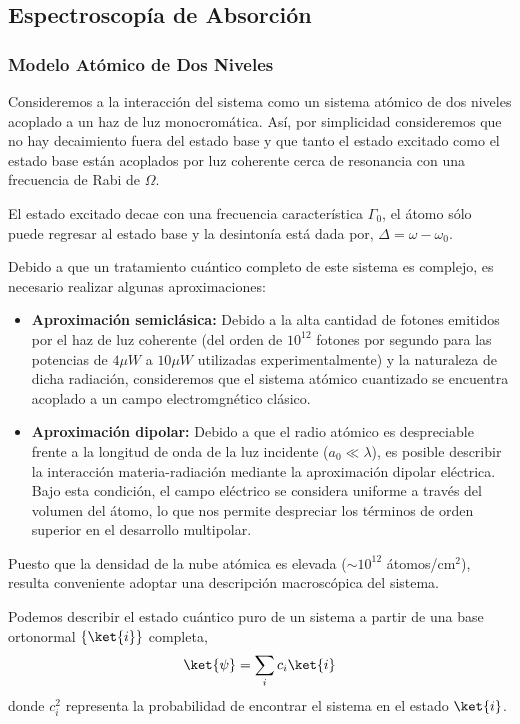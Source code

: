 \subsection{Espectroscopía de Absorción}

\subsubsection{Modelo Atómico de Dos Niveles}
Consideremos a la interacción del sistema como un sistema atómico de dos niveles acoplado a un haz de luz monocromática. Así, por simplicidad consideremos que no hay decaimiento fuera del estado base y que tanto el estado excitado como el estado base están acoplados por luz coherente cerca de resonancia con una frecuencia de Rabi de $\Omega$.

El estado excitado decae con una frecuencia característica $\Gamma_0$, el átomo sólo puede regresar al estado base y la desintonía está  dada por, $\Delta = \omega - \omega_0$.

Debido a que un tratamiento cuántico completo de este sistema es complejo, es necesario realizar algunas aproximaciones:

\begin{itemize}
    \item \textbf{Aproximación semiclásica:} Debido a la alta cantidad de fotones emitidos por el haz de luz coherente (del orden de $10^{12}$ fotones por segundo para las potencias de $4\mu W$ a $10 \mu W$ utilizadas experimentalmente) y la naturaleza de dicha radiación, consideremos que el sistema atómico cuantizado se encuentra acoplado a un campo electromgnético clásico.
    \item \textbf{Aproximación dipolar:} Debido a que el radio atómico es despreciable frente a la longitud de onda de la luz incidente ($a_0 \ll \lambda$), es posible describir la interacción materia-radiación mediante la aproximación dipolar eléctrica. Bajo esta condición, el campo eléctrico se considera uniforme a través del volumen del átomo, lo que nos permite despreciar los términos de orden superior en el desarrollo multipolar.
\end{itemize}
Puesto que la densidad de la nube atómica es elevada ($\sim 10^{12}$ átomos/$\text{cm}^2$), resulta conveniente adoptar una descripción macroscópica del sistema.

Podemos describir el estado cuántico puro de un sistema a partir de una base ortonormal $\{\ket{i}\}$
completa, 
\begin{equation}
    \ket{\psi} = \sum_i c_i \ket{i}
\end{equation}
donde $c_i^2$ representa la probabilidad de encontrar el sistema en el estado $\ket{i}$.

